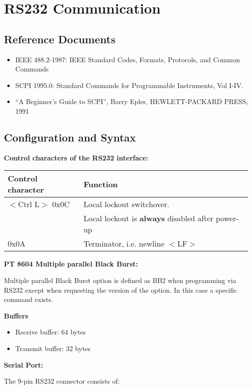 \section{RS232 Communication}

\subsection{Reference Documents}

\begin{itemize}
\item IEEE 488.2-1987: IEEE Standard Codes, Formats, Protocols, and Common Commands
\item SCPI 1995.0: Standard Commands for Programmable Instruments, Vol I-IV.
\item ``A Beginner's Guide to SCPI'', Barry Epler, HEWLETT-PACKARD PRESS, 1991
\end{itemize}

\subsection{Configuration and Syntax}

\textbf{Control characters of the RS232 interface:}

\begin{tabular}{|l|l|}
\hline
Control character 	& Function \\ \hline
$<$Ctrl L$>$ 0x0C 	& Local lockout switchover. \\ 
										& Local lockout is \textbf{always} disabled after power-up \\ \hline
0x0A	 							& Terminator, i.e. newline $<$LF$>$ \\ \hline
\end{tabular}

\textbf{PT 8604 Multiple parallel Black Burst:}


Multiple parallel Black Burst option is defined as BB2 when programming via RS232 except when requesting the version of the option. In this case a specific command exists.

\textbf{Buffers}

\begin{itemize}
\item Receive buffer: 64 bytes
\item Transmit buffer: 32 bytes
\end{itemize}

\textbf{Serial Port:}

The 9-pin RS232 connector consists of:

